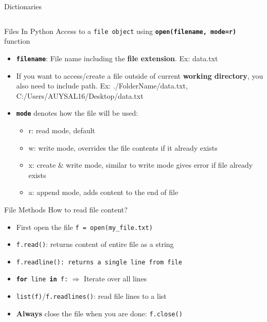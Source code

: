     \begin{frame}{Dictionaries}
        \large
        \inputminted[frame=single,framesep=2pt]{python3}{../Lecture5/code-examples/dicts.py}
    \end{frame}

    \begin{frame}{Files In Python}
        \LARGE
        Access to a \texttt{file object} using \texttt{\textbf{open(filename, mode=\textquotesingle r\textquotesingle )}} function        
        \begin{itemize}
            \Large
            \item \texttt{\textbf{filename}}: File name including the \textbf{file extension}. Ex: \textquotesingle data.txt\textquotesingle
            \item If you want to access/create a file outside of current \textbf{working directory}, you also need to include path. Ex: \textquotesingle ./FolderName/data.txt\textquotesingle , \textquotesingle C:/Users/AUYSAL16/Desktop/data.txt\textquotesingle 
            \item \textbf{\texttt{mode}} denotes how the file will be used:
            \begin{itemize}
                \large
                \item \textquotesingle r\textquotesingle : read mode, default
                \item \textquotesingle w\textquotesingle : write mode, overrides the file contents if it already exists
                \item \textquotesingle x\textquotesingle : create \& write mode, similar to write mode gives error if file already exists
                \item \textquotesingle a\textquotesingle : append mode, adds content to the end of file
            \end{itemize}
        \end{itemize}
    \end{frame}

    \begin{frame}{File Methods}
        \LARGE
        How to read file content?
        \begin{itemize}
            \item First open the file \texttt{f = open(\textquotesingle my\_file.txt\textquotesingle)}
            \item \texttt{f.read()}: returns content of entire file as a string
            \item \texttt{f.readline(): returns a single line from file}
            \item \texttt{\textbf{for} line \textbf{in} f:} $\Rightarrow$ Iterate over all lines
            \item \texttt{list(f)}/\texttt{f.readlines()}: read file lines to a list
            \item \textbf{Always} close the file when you are done: \texttt{f.close()}
        \end{itemize}        
    \end{frame}

